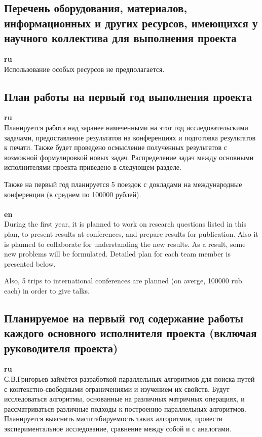 \documentclass[12pt]{article}  %
\theoremstyle{remark}
\begin{document}
\subsection{Перечень оборудования, материалов, информационных и других ресурсов, имеющихся у научного коллектива для выполнения проекта}
\textbf{ru}\\
%
Использование особых ресурсов не предполагается.

\subsection{План работы на первый год выполнения проекта}

\textbf{ru}\\
%
Планируется работа над заранее намеченными на этот год исследовательскими задачами, предоставление результатов на конференциях и подготовка результатов к печати. Также будет проведено осмысление полученных результатов с возможной формулировкой новых задач. Распределение задач между основными исполнителями проекта приведено в следующем разделе.

Также на первый год планируется 5 поездок с докладами на международные конференции (в среднем по 100000 рублей).
\\
\\
\textbf{en}\\
During the first year, it is planned to work on research questions listed in this plan, to present results at conferences, and prepare results for publication. Also it is planned to collaborate for understanding the new results. As a result, some new problems will be formulated. Detailed plan for each team member is presented below.

Also, 5 trips to international conferences are planned (on averge, 100000 rub. each) in order to give talks.



\subsection{Планируемое на первый год содержание работы каждого основного исполнителя проекта (включая руководителя проекта)}

\textbf{ru}\\
%
С.В.Григорьев займётся разработкой параллельных алгоритмов для поиска путей с контекстно-свободными ограничениями и изучением их свойств. Будут исследоваться алгоритмы, основанные на различных матричных операциях, и рассматриваться различные подходы к построению параллельных алгоритмов. Планируется выяснить масштабируемость таких алгоритмов, провести экспериментальное исследование, сравнение между собой и с аналогами.
\end{document}
